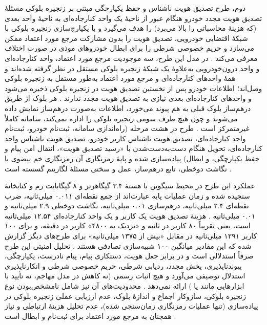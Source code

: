 \documentclass[12pt,a4paper]{article}
\begin{document}
دوم، طرح تصدیق هویت ناشناس و حفظ یکپارچگی مبتنی بر زنجیره بلوکی  مسئلهٔ تصدیق هویت مجدد خودرو هنگام عبور از ناحیهٔ یک واحد کنارجاده‌ای به ناحیهٔ واحد بعدی (که هزینهٔ محاسباتی را بالا می‌برد) را هدف می‌گیرد و با یکپارچ‌سازی زنجیره بلوکی با شبکهٔ اقتضایی خودرویی، تصدیق هویت را بدون مشارکت مرجع مورد اعتماد ممکن می‌سازد و حریم خصوصی شرطی را برای ابطال خودرو‌های موذی در صورت اختلاف معرفی می‌کند \cite{mariaBAIVEfficientBlockchainBased2022}. در مدل این طرح، سه موجودیت مرجع مورد اعتماد، واحد کنارجاده‌ای و واحد درون‌خودرویی به‌علاوهٔ یک شبکهٔ زنجیره بلوکی مستقل در نظر گرفته شده‌اند و همهٔ واحد‌های کنارجاده‌ای و مرجع مورد اعتماد به‌طور مستقل به زنجیره بلوکی وصل‌اند؛ اطلاعات خودرو پس از نخستین تصدیق هویت در زنجیره بلوکی ذخیره می‌شود و واحد‌های کنارجاده‌ای بعدی نیازی به تصدیق هویت مجدد ندارند \cite{mariaBAIVEfficientBlockchainBased2022}. هر بلوک از طریق درهم‌ساز بلوک قبلی به هم پیوند می‌خورد، اطلاعات به‌صورت درهم‌ساز  نمایش داده می‌شوند و چون هیچ طرف سومی زنجیره بلوکی را اداره نمی‌کند، سامانه کاملاً غیرمتمرکز است \cite{mariaBAIVEfficientBlockchainBased2022}. طرح در هشت مرحله (راه‌اندازی سامانه، ثبت‌نام خودرو، ثبت‌نام واحد کنارجاده‌ای، تصدیق هویت ناشناس کاربر خودرو، تصدیق هویت ناشناس واحد کنارجاده‌ای، تحویل هنگام دست‌به‌دست‌شدن با «رسید تصدیق هویت»، انتقال امن پیام و حفظ یکپارچگی، و ابطال) پیاده‌سازی شده و پایهٔ رمزنگاری آن رمزنگاری خم بیضوی با نگاشت دوخطی، تابع درهم‌ساز، عمل  و سختی مسئلهٔ لگاریتم گسسته است \cite{mariaBAIVEfficientBlockchainBased2022}.

عملکرد این طرح در محیط سیگوین با هستهٔ  ۳.۴ گیگاهرتز و ۸ گیگابایت رم و کتابخانهٔ  سنجیده شده و زمان عملیات پایه عبارت‌اند از جمع نقطه‌ای ۰.۰۱۱ میلی‌ثانیه، ضرب نقطه‌ای ۲.۴ میلی‌ثانیه، درهم‌سازی ۰.۰۱ میلی‌ثانیه، نگاشت دوخطی ۲.۹ میلی‌ثانیه و  ۰.۰۱ میلی‌ثانیه \cite{mariaBAIVEfficientBlockchainBased2022}. هزینهٔ تصدیق هویت یک کاربر و یک واحد کنارجاده‌ای ۱۲.۵۴ میلی‌ثانیه است، یعنی تقریباً ۸۰ کاربر در ثانیه و «نزدیک به ۴۸۰۰» کاربر در دقیقه، و برای ۱۰۰ کاربر ۱۲۹۱ میلی‌ثانیه در مقابل «بیش از ۱۳۷۵ میلی‌ثانیه» برای طرح‌های دیگر گزارش شده که این مقادیر میانگین ۱۰۰ شبیه‌سازی تصادفی هستند \cite{mariaBAIVEfficientBlockchainBased2022}. تحلیل امنیتی این طرح صرفاً استدلالی است و در برابر جعل هویت، دستکاری پیام، پیام نادرست، یکپارچگی، پیوندناپذیری، پخش مجدد، ردیابی شرطی، حریم خصوصی شرطی و انکارناپذیری استدلال توصیفی می‌آورد و هیچ اثبات رسمی (نه کاهش در مدل مهاجم، نه تأیید با ابزار‌هایی مانند  یا ) ارائه نمی‌دهد \cite{mariaBAIVEfficientBlockchainBased2022}. محدودیت‌های آن نیز شامل نامشخص‌بودن نوع زنجیره بلوکی، سازوکار اجماع و اندازهٔ بلوک، عدم ارزیابی عملی زنجیره بلوکی در پیاده‌سازی (تنها عملیات رمزنگاری زمان‌سنجی شده)، عدم تحلیل هزینهٔ ارتباطی و نیاز همچنان به مرجع مورد اعتماد برای ثبت‌نام و ابطال است \cite{mariaBAIVEfficientBlockchainBased2022}.
\end{document}
